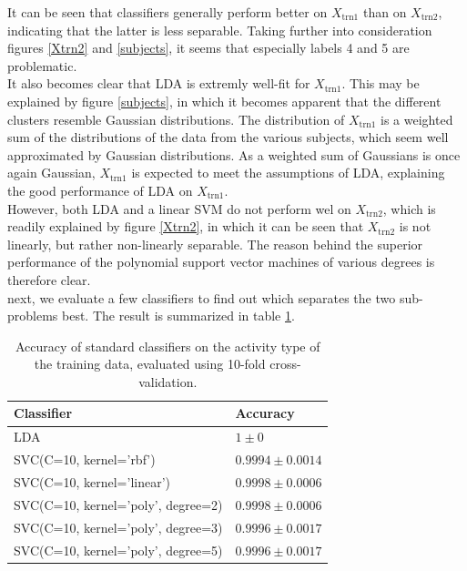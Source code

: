 \documentclass [a4paper] {report}
\begin{document}
	\noindent
	It can be seen that classifiers generally perform better on $X_{\text{trn1}}$ than on $X_{\text{trn2}}$, indicating that the latter is less separable. Taking further into consideration figures \ref{Xtrn2} and \ref{subjects}, it seems that especially labels 4 and 5 are problematic. \\
	It also becomes clear that LDA is extremly well-fit for $X_{\text{trn1}}$. This may be explained by figure \ref{subjects}, in which it becomes apparent that the different clusters resemble Gaussian distributions. The distribution of $X_{\text{trn1}}$ is a weighted sum of the distributions of the data from the various subjects, which seem well approximated by Gaussian distributions. As a weighted sum of Gaussians is once again Gaussian, $X_{\text{trn1}}$ is expected to meet the assumptions of LDA, explaining the good performance of LDA on $X_{\text{trn1}}$. \\
	However, both LDA and a linear SVM do not perform wel on $X_{\text{trn2}}$, which is readily explained by figure \ref{Xtrn2}, in which it can be seen that $X_{\text{trn2}}$ is not linearly, but rather non-linearly separable. The reason behind the superior performance of the polynomial support vector machines of various degrees is therefore clear.\\
	
	\noindent
	next, we evaluate a few classifiers to find out which separates the two sub-problems best. The result is summarized in table \ref{tab:separator}.
	
	\begin{table}[H]
		\centering
		\caption{Accuracy of standard classifiers on the activity type of the training data, evaluated using 10-fold cross-validation.}
		\label{tab:separator}
		\begin{tabular}{l|l}
			Classifier 							& Accuracy  \\ \hline
			LDA 								& $1 \pm 0 $\\
			SVC(C=10, kernel='rbf') 			& $0.9994 \pm 0.0014 $\\
			SVC(C=10, kernel='linear') 			& $0.9998 \pm 0.0006 $\\
			SVC(C=10, kernel='poly', degree=2) 	& $0.9998 \pm 0.0006 $\\
			SVC(C=10, kernel='poly', degree=3) 	& $0.9996 \pm 0.0017 $\\
			SVC(C=10, kernel='poly', degree=5) 	& $0.9996 \pm 0.0017 $\\
		\end{tabular}		
	\end{table}
	
\end{document}
